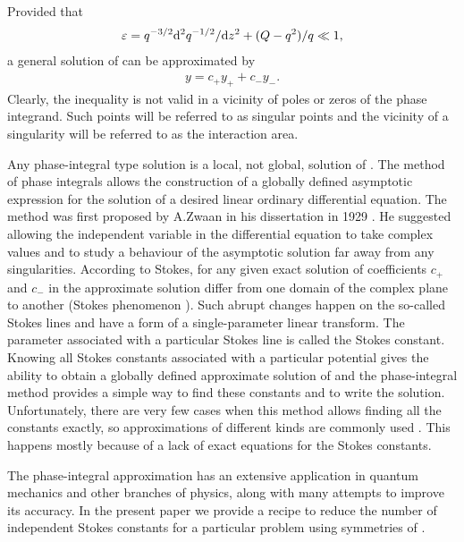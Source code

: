 \documentclass[12pt]{iopart}
\begin{document}
Provided that 
\begin{eqnarray}
\varepsilon = q^{-3/2} \mathrm{d}^2 q^{-1/2}/\mathrm{d} z^2  + (Q - q^2)/q \ll 1,   \label{eq:cond}
\end{eqnarray}
a general solution of  can be approximated by
\begin{eqnarray}
y = c_+y_+ + c_-y_-. \label{eq:gensol}
\end{eqnarray}
Clearly, the inequality  is not valid in a vicinity of poles or zeros of 
the phase integrand. Such points will be referred to as singular points and the 
vicinity of a singularity will be referred to as the interaction area.

Any phase-integral type solution  is a local, not global, solution of . 
The method of phase integrals allows the construction of a globally defined 
asymptotic expression for the solution of a desired linear ordinary differential 
equation. The method was first proposed by A.Zwaan in his dissertation in 1929 \cite{zwaan}. 
He suggested allowing the independent variable in the differential equation to take 
complex values and to study a behaviour of the asymptotic solution far away from any 
singularities. According to Stokes\cite{stokes}, for any given exact solution 
of  coefficients $c_+$ and $c_-$ in the approximate solution  
differ from one domain of the complex plane to another 
(Stokes phenomenon \cite{stokes,white,heading,frbook}). Such abrupt 
changes happen on the so-called Stokes lines and have a form of a single-parameter 
linear transform\cite{heading}. The parameter associated with a particular Stokes line 
is called the Stokes constant. Knowing all Stokes constants associated with a particular 
potential gives the ability to obtain a globally defined approximate solution 
of \cite{heading,white} and the phase-integral method provides a simple 
way to find these constants and to write the solution. Unfortunately, there are very few 
cases when this method allows finding all the constants exactly, so approximations of different 
kinds are commonly used \cite{white,ours}. This happens mostly because of a lack of 
exact equations for the Stokes constants.
 
The phase-integral approximation has an extensive application in quantum mechanics and other branches of
physics, along with many attempts to improve its accuracy\cite{dunham,dingle73,berry90,berry91,sergeenko96,delabaere97,sergeenko02,mirnov10,poor16,esposito09,aleixo00}. 
In the present paper we provide a recipe to reduce the number 
of independent Stokes constants for a particular problem using symmetries of . 
\end{document}
